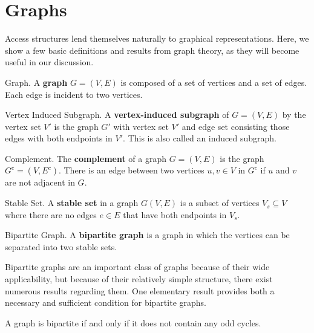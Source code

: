 \chapter{Graphs}
\label{ch:graphs}

Access structures lend themselves naturally to graphical representations. Here, we show a few basic definitions and results from graph theory, as they will become useful in our discussion.

\begin{definition}{Graph.}
    \label{defn:graph}
    A \textbf{graph} $G=(V,E)$ is composed of a set of vertices and a set of edges. Each edge is incident to two vertices.
\end{definition}

\begin{definition}{Vertex Induced Subgraph.}
    \label{defn:vert-induced-subgraph}
    A \textbf{vertex-induced subgraph} of $G=(V,E)$ by the vertex set $V'$ is the graph $G'$ with vertex set $V'$ and edge set consisting those edges with both endpoints in $V'$. This is also called an induced subgraph.
\end{definition}

\begin{definition}{Complement.}
    \label{defn:graph-complement}
    The \textbf{complement} of a graph $G=(V,E)$ is the graph $G^c = (V,E^c)$. There is an edge between two vertices $u,v \in V$ in $G^c$ if $u$ and $v$ are not adjacent in $G$. 
\end{definition}

\begin{definition}{Stable Set.}
    \label{defn:stable-set}
    A \textbf{stable set} in a graph $G(V,E)$ is a subset of vertices $V_s \subseteq  V$ where there are no edges $e \in E$ that have both endpoints in $V_s$.
\end{definition}

\begin{definition}{Bipartite Graph.}
    \label{defn:bipartite}
	A \textbf{bipartite graph} is a graph in which the vertices can be separated into two stable sets.
\end{definition}

Bipartite graphs are an important class of graphs because of their wide applicability, but because of their relatively simple structure, there exist numerous results regarding them. One elementary result provides both a necessary and sufficient condition for bipartite graphs.

\begin{nonumtheorem}
    \label{thm:bipartite-odd}
    A graph is bipartite if and only if it does not contain any odd cycles.
\end{nonumtheorem}

